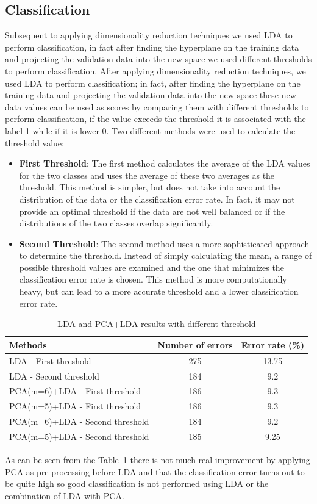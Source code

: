 \documentclass{article}
\begin{document}
\subsection{Classification}
Subsequent to applying dimensionality reduction techniques we used LDA to perform classification, in fact after finding the hyperplane on the training data and projecting the validation data into the new space we used different thresholds to perform classification.
After applying dimensionality reduction techniques, we used LDA to perform classification; in fact, after finding the hyperplane on the training data and projecting the validation data into the new space these new data values can be used as scores by comparing them with different thresholds to perform classification, if the value exceeds the threshold it is associated with the label 1 while if it is lower 0.
Two different methods were used to calculate the threshold value:
\begin{itemize}

\item \textbf{First Threshold}: The first method calculates the average of the LDA values for the two classes and uses the average of these two averages as the threshold. This method is simpler, but does not take into account the distribution of the data or the classification error rate. In fact, it may not provide an optimal threshold if the data are not well balanced or if the distributions of the two classes overlap significantly.
\item \textbf{Second Threshold}: The second method uses a more sophisticated approach to determine the threshold. Instead of simply calculating the mean, a range of possible threshold values are examined and the one that minimizes the classification error rate is chosen. This method is more computationally heavy, but can lead to a more accurate threshold and a lower classification error rate.  
\end{itemize}
\begin{table}[H]
    \centering
    \begin{tabular}{lcc}
    \hline
    \textbf{Methods} & \textbf{Number of errors} & \textbf{Error rate (\%)} \\
    \hline
    LDA - First threshold & 275 & 13.75 \\
    LDA - Second threshold & 184 & 9.2 \\
    \hline
    PCA(m=6)+LDA - First threshold & 186 & 9.3 \\
    PCA(m=5)+LDA - First threshold & 186 & 9.3 \\
    PCA(m=6)+LDA - Second threshold & 184 & 9.2 \\
    PCA(m=5)+LDA - Second threshold & 185 & 9.25 \\
    \hline
    \end{tabular}
    \caption{LDA and PCA+LDA results with different threshold}
    \label{tab:resultsPCALDA}
\end{table}
As can be seen from the Table~\ref{tab:resultsPCALDA} there is not much real improvement by applying PCA as pre-processing before LDA and that the classification error turns out to be quite high so good classification is not performed using LDA or the combination of LDA with PCA.
\end{document}
